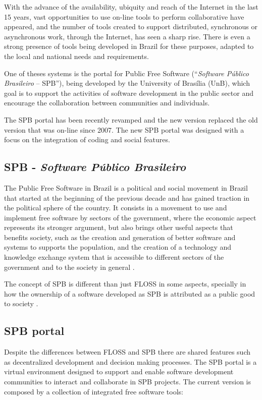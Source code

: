 \documentclass{sigchi}
\begin{document}
With the advance of the availability, ubiquity and reach of the Internet in the last 15 years, vast opportunities to use on-line tools to perform collaborative have appeared, and the number of tools created to support distributed, synchronous or asynchronous work, through the Internet, has seen a sharp rise. There is even a strong presence of tools being developed in Brazil for these purposes, adapted to the local and national needs and requirements.

One of theses systems is the portal for Public Free Software (``\textit{Software Público Brasileiro} – SPB''), being developed by the University of Brasília (UnB), which goal is to support the activities of software development in the public sector and encourage the collaboration between communities and individuals.

The SPB portal has been recently revamped and the new version replaced the old version that was on-line since 2007. The new SPB portal was designed with a focus on the integration of coding and social features. 

\subsection{SPB - \textit{\textbf{Software Público Brasileiro}}}

The Public Free Software in Brazil is a political and social movement in Brazil that started at the beginning of the previous decade and has gained traction in the political sphere of the country. It consists in a movement to use and implement free software by sectors of the government, where the economic aspect represents its stronger argument, but also brings other useful aspects that benefits society, such as the creation and generation of better software and systems to supports the population, and the creation of a technology and knowledge exchange system that is accessible to different sectors of the government and to the society in general \cite{DeFreitas2012}.

The concept of SPB is different than just FLOSS in some aspects, specially in how the ownership of a software developed as SPB is attributed as a public good to society \cite{Meirelles2015}.

\subsection{SPB portal}

Despite the differences between FLOSS and SPB there are shared features such as decentralized development and decision making processes. The SPB portal is a virtual environment designed to support and enable software development communities to interact and collaborate in SPB projects\cite{Meirelles2015}. The current version is composed by a collection of integrated free software tools:
\end{document}
